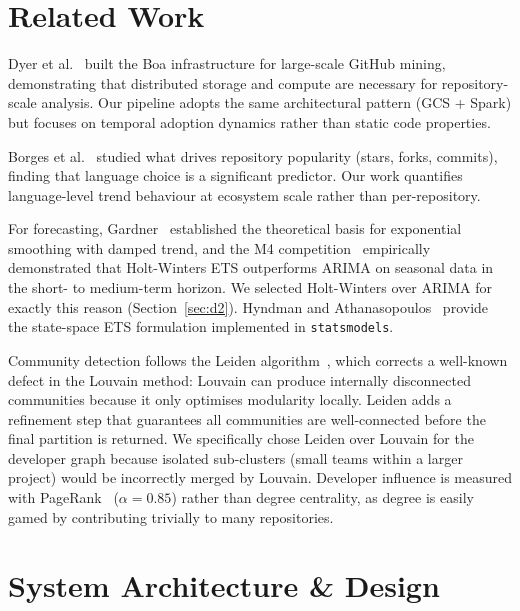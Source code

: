 \documentclass[conference]{IEEEtran}
\begin{document}
\section{Related Work}

Dyer et al.~\cite{dyer2013boa} built the Boa infrastructure for large-scale
GitHub mining, demonstrating that distributed storage and compute are
necessary for repository-scale analysis. Our pipeline adopts the same
architectural pattern (GCS + Spark) but focuses on temporal adoption dynamics
rather than static code properties.

Borges et al.~\cite{borges2016popularity} studied what drives repository
popularity (stars, forks, commits), finding that language choice is a
significant predictor. Our work quantifies language-level trend behaviour
at ecosystem scale rather than per-repository.

For forecasting, Gardner~\cite{gardner1985exponential} established the
theoretical basis for exponential smoothing with damped trend, and the M4
competition~\cite{makridakis2018m4} empirically demonstrated that Holt-Winters
ETS outperforms ARIMA on seasonal data in the short- to medium-term horizon.
We selected Holt-Winters over ARIMA for exactly this reason (Section~\ref{sec:d2}).
Hyndman and Athanasopoulos~\cite{hyndman2018forecasting} provide the
state-space ETS formulation implemented in \texttt{statsmodels}.

Community detection follows the Leiden algorithm~\cite{traag2019leiden},
which corrects a well-known defect in the Louvain method: Louvain can produce
internally disconnected communities because it only optimises modularity
locally. Leiden adds a refinement step that guarantees all communities are
well-connected before the final partition is returned. We specifically chose
Leiden over Louvain for the developer graph because isolated sub-clusters
(small teams within a larger project) would be incorrectly merged by Louvain.
Developer influence is measured with PageRank~\cite{brin1998pagerank}
($\alpha = 0.85$) rather than degree centrality, as degree is easily gamed
by contributing trivially to many repositories.

\section{System Architecture \& Design}
\end{document}

